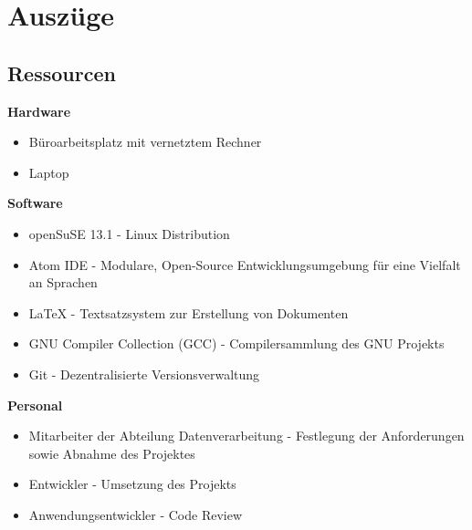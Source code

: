 \section{Auszüge}
\subsection{Ressourcen}
\label{auszug:ressourcen}
\textbf{Hardware}
\begin{itemize}
    \item Büroarbeitsplatz mit vernetztem Rechner
    \item Laptop
\end{itemize}

\textbf{Software}
\begin{itemize}
    \item openSuSE 13.1 - Linux Distribution
    \item Atom IDE - Modulare, Open-Source Entwicklungsumgebung für eine Vielfalt an Sprachen
    \item LaTeX - Textsatzsystem zur Erstellung von Dokumenten
    \item GNU Compiler Collection (GCC) - Compilersammlung des GNU Projekts
    \item Git - Dezentralisierte Versionsverwaltung
\end{itemize}

\textbf{Personal}
\begin{itemize}
    \item Mitarbeiter der Abteilung Datenverarbeitung - Festlegung der Anforderungen sowie Abnahme des Projektes
    \item Entwickler - Umsetzung des Projekts
    \item Anwendungsentwickler - Code Review
\end{itemize}


